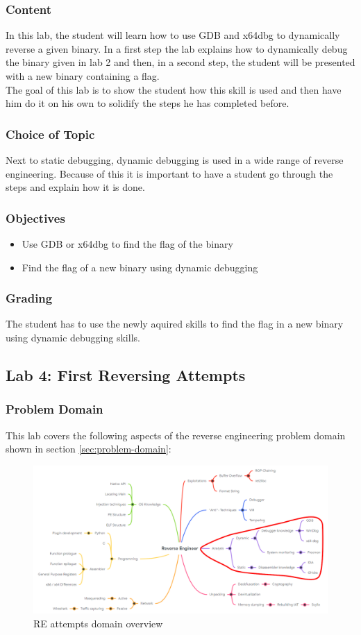 \subsubsection*{Content}
In this lab, the student will learn how to use GDB and x64dbg to dynamically reverse a given binary. In a first step the lab explains how to dynamically debug the binary given in lab 2 and then, in a second step, the student will be presented with a new binary containing a flag. \\
The goal of this lab is to show the student how this skill is used and then have him do it on his own to solidify the steps he has completed before.
\subsubsection*{Choice of Topic}
Next to static debugging, dynamic debugging is used in a wide range of reverse engineering. Because of this it is important to have a student go through the steps and explain how it is done. 
\subsubsection*{Objectives}
\begin{itemize}
    \item Use GDB or x64dbg to find the flag of the binary
    \item Find the flag of a new binary using dynamic debugging
\end{itemize}
\subsubsection*{Grading}
The student has to use the newly aquired skills to find the flag in a new binary using dynamic debugging skills.
\pagebreak

\subsection{Lab 4: First Reversing Attempts}
\subsubsection*{Problem Domain}
This lab covers the following aspects of the reverse engineering problem domain shown in section \ref{sec:problem-domain}:
\vspace{-2ex}
\begin{figure}[H]
    \includegraphics[width=\textwidth]{resources/reattempts-overview-light.png}
    \caption{RE attempts domain overview}
    \label{fig:reattempts-overview}
\end{figure}
